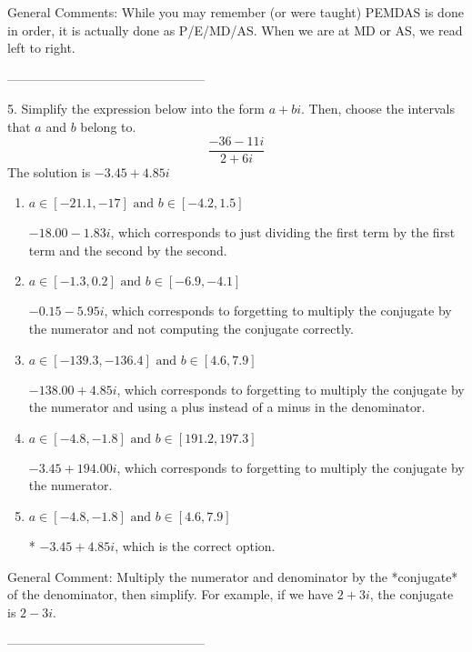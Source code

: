 \documentclass{extbook}[14pt]
\begin{document}
General Comments: While you may remember (or were taught) PEMDAS is done in order, it is actually done as P/E/MD/AS. When we are at MD or AS, we read left to right.

-----------------------------------------------

5. Simplify the expression below into the form $a+bi$. Then, choose the intervals that $a$ and $b$ belong to.
\[ \frac{-36  - 11 i}{2  + 6 i} \] 
The solution is $ -3.45  + 4.85 i $ 

\begin{enumerate}[label=\Alph*.] 
\item $ a \in [-21.1, -17] \text{ and } b \in [-4.2, 1.5] $ 

  $-18.00  - 1.83 i$, which corresponds to just dividing the first term by the first term and the second by the second. 
\item $ a \in [-1.3, 0.2] \text{ and } b \in [-6.9, -4.1] $ 

  $-0.15  - 5.95 i$, which corresponds to forgetting to multiply the conjugate by the numerator and not computing the conjugate correctly. 
\item $ a \in [-139.3, -136.4] \text{ and } b \in [4.6, 7.9] $ 

  $-138.00  + 4.85 i$, which corresponds to forgetting to multiply the conjugate by the numerator and using a plus instead of a minus in the denominator. 
\item $ a \in [-4.8, -1.8] \text{ and } b \in [191.2, 197.3] $ 

  $-3.45  + 194.00 i$, which corresponds to forgetting to multiply the conjugate by the numerator. 
\item $ a \in [-4.8, -1.8] \text{ and } b \in [4.6, 7.9] $ 

 * $-3.45  + 4.85 i$, which is the correct option. 
\end{enumerate} 
 
General Comment: Multiply the numerator and denominator by the *conjugate* of the denominator, then simplify. For example, if we have $2+3i$, the conjugate is $2-3i$.

-----------------------------------------------
\end{document}
